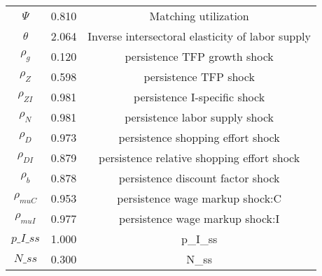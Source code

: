 \begin{center}
\begin{longtable}{ccc}
${\Psi}$ 	 & 	 0.810 	 & 	 Matching utilization\\
${\theta}$ 	 & 	 2.064 	 & 	 Inverse intersectoral elasticity of labor supply\\
${\rho_g}$ 	 & 	 0.120 	 & 	 persistence TFP growth shock\\
${\rho_Z}$ 	 & 	 0.598 	 & 	 persistence TFP shock\\
${\rho_{ZI}}$ 	 & 	 0.981 	 & 	 persistence I-specific shock\\
${\rho_N}$ 	 & 	 0.981 	 & 	 persistence labor supply shock\\
${\rho_D}$ 	 & 	 0.973 	 & 	 persistence shopping effort shock\\
${\rho_{DI}}$ 	 & 	 0.879 	 & 	 persistence relative shopping effort shock\\
${\rho_b}$ 	 & 	 0.878 	 & 	 persistence discount factor shock\\
${\rho_{muC}}$ 	 & 	 0.953 	 & 	 persistence wage markup shock:C\\
${\rho_{muI}}$ 	 & 	 0.977 	 & 	 persistence wage markup shock:I\\
$p\_I\_ss$ 	 & 	 1.000 	 & 	 p\_I\_ss\\
$N\_ss$ 	 & 	 0.300 	 & 	 N\_ss\\
\bottomrule%
\end{longtable}
\end{center}
